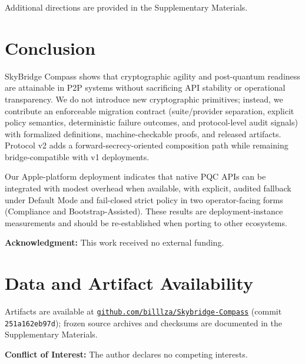 \documentclass[10pt,journal,compsoc]{IEEEtran}
\newcommand{\artifacturl}{https://github.com/billlza/Skybridge-Compass}
\newcommand{\artifactsha}{251a162eb97d}
\begin{document}
\noindent Additional directions are provided in the Supplementary Materials.



\section{Conclusion}\label{sec:conclusion}

SkyBridge Compass shows that cryptographic agility and post-quantum
readiness are attainable in P2P systems without sacrificing API
stability or operational transparency. We do not introduce new
cryptographic primitives; instead, we contribute an enforceable migration
contract (suite/provider separation, explicit policy semantics,
deterministic failure outcomes, and protocol-level audit signals) with
formalized definitions, machine-checkable proofs, and released artifacts.
Protocol v2 adds a forward-secrecy-oriented composition path while
remaining bridge-compatible with v1 deployments.

Our Apple-platform deployment indicates that native PQC APIs can be
integrated with modest overhead when available, with explicit, audited
fallback under Default Mode and fail-closed strict policy in two
operator-facing forms (Compliance and Bootstrap-Assisted). These results
are deployment-instance measurements and should be re-established when
porting to other ecosystems.







\noindent\textbf{Acknowledgment:} This work received no external funding.

\section*{Data and Artifact Availability}

\noindent Artifacts are available at
\href{\artifacturl}{\nolinkurl{github.com/billlza/Skybridge-Compass}}
(commit \texttt{\artifactsha}); frozen source archives and checksums are
documented in the Supplementary Materials.

\noindent\textbf{Conflict of Interest:} The author declares no competing interests.

\end{document}

